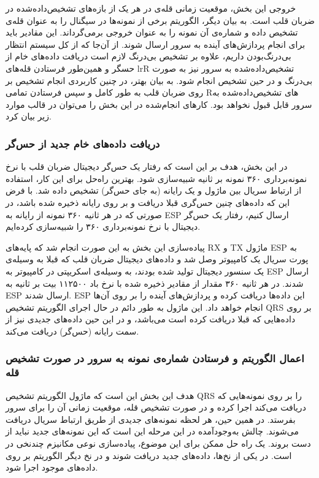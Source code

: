 خروجی این بخش، موقعیت زمانی قله‌ی  در هر یک از بازه‌های  تشخیص‌داده‌شده در ضربان قلب است. به بیان دیگر، الگوریتم برخی از نمونه‌ها در سیگنال را به عنوان قله‌ی  تشخیص داده و شماره‌ی آن نمونه را به عنوان خروجی برمی‌گرداند. این مقادیر باید برای انجام پردازش‌های آینده به سرور ارسال شوند. از آن‌جا که از کل سیستم انتظار بی‌درنگ‌بودن داریم، علاوه بر تشخیص بی‌درنگ  لازم است دریافت داد‌ه‌های خام از حسگر و همین‌طور فرستادن قله‌های lr{R} تشخیص‌داده‌شده به سرور نیز به صورت بی‌درنگ و در حین تشخیص  انجام شود. به بیان بهتر، در چنین کاربردی انجام تشخیص  بر روی ضربان قلب به طور کامل و سپس فرستادن تمامی Rهای تشخیص‌داده‌شده به سرور قابل قبول نخواهد بود.
کارهای انجام‌شده در این بخش را می‌توان در قالب موارد زیر بیان کرد. 
\subsubsection{دریافت داده‌های خام جدید از حس‌گر}
در این بخش، هدف بر این است که رفتار یک حس‌گر دیجیتال ضربان قلب با نرخ نمونه‌برداری ۳۶۰ نمونه بر ثانیه شبیه‌سازی شود. بهترین راه‌حل برای این کار، استفاده از ارتباط سریال بین ماژول و یک رایانه (به جای حس‌گر) تشخیص داده شد. با فرض این که داده‌های چنین حس‌گری قبلا دریافت و بر روی رایانه ذخیره شده باشد، در صورتی که در هر ثانیه ۳۶۰ نمونه از رایانه به ESP ارسال کنیم، رفتار یک حس‌گر دیجیتال با نرخ نمونه‌برداری ۳۶۰ را شبیه‌سازی کرده‌ایم.

پیاده‌سازی این بخش به این صورت انجام شد که پایه‌های RX و TX ماژول ESP به پورت سریال یک کامپیوتر وصل شد و داده‌های دیجیتال ضربان قلب که قبلا به وسیله‌ی یک سنسور دیجیتال تولید شده بودند،‌ به وسیله‌ی اسکریپتی در کامپیوتر به ESP ارسال شدند. در هر ثانیه ۳۶۰ مقدار از مقادیر ذخیره شده با نرخ باد ۱۱۲۵۰۰ بیت بر ثانیه به ESP ارسال شدند. ESP این داده‌ها دریافت کرده و پردازش‌های آینده را بر روی آن‌ها انجام خواهد داد. این ماژول به طور دائم در حال اجرای الگوریتم تشخیص QRS بر روی داده‌هایی که قبلا دریافت کرده است می‌باشد، و در این حین داده‌های جدیدی نیز از سمت رایانه (حس‌گر) دریافت می‌کند.
\subsubsection{اعمال الگوریتم و فرستادن شماره‌ی نمونه به  سرور
 در صورت تشخیص قله}
	 هدف این بخش این است که  ماژول  الگوریتم تشخیص QRS را بر روی نمونه‌هایی که دریافت می‌کند اجرا کرده و در صورت تشخیص قله، موقعیت زمانی آن را برای سرور بفرستد. در همین حین، هر لحظه نمونه‌های جدیدی از طریق ارتباط سریال دریافت می‌شوند. چالش به‌وجودآمده در این مرحله این است که این نمونه‌های جدید نباید از دست بروند. یک راه حل ممکن برای این موضوع،‌ پیاده‌سازی نوعی مکانیزم چندنخی در  است. در یکی از نخ‌ها، داده‌های جدید دریافت شوند و در نخ دیگر الگوریتم بر روی داده‌‌های موجود اجرا شود.
	 
